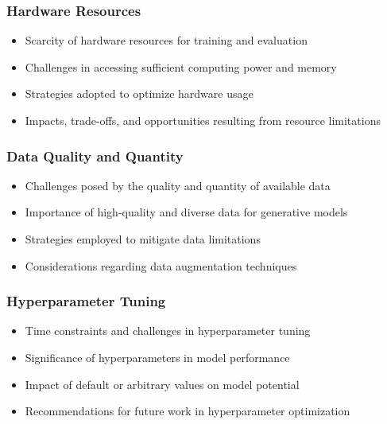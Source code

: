 \begin{frame}
    \frametitle{Hardware Resources}

    \begin{itemize}
        \item Scarcity of hardware resources for training and evaluation
        \item Challenges in accessing sufficient computing power and memory
        \item Strategies adopted to optimize hardware usage
        \item Impacts, trade-offs, and opportunities resulting from resource limitations
    \end{itemize}
    
\end{frame}

\begin{frame}
    \frametitle{Data Quality and Quantity}

    \begin{itemize}
        \item Challenges posed by the quality and quantity of available data
        \item Importance of high-quality and diverse data for generative models
        \item Strategies employed to mitigate data limitations
        \item Considerations regarding data augmentation techniques
    \end{itemize}
    
\end{frame}

\begin{frame}
    \frametitle{Hyperparameter Tuning}

    \begin{itemize}
        \item Time constraints and challenges in hyperparameter tuning
        \item Significance of hyperparameters in model performance
        \item Impact of default or arbitrary values on model potential
        \item Recommendations for future work in hyperparameter optimization
    \end{itemize}
    
\end{frame}


